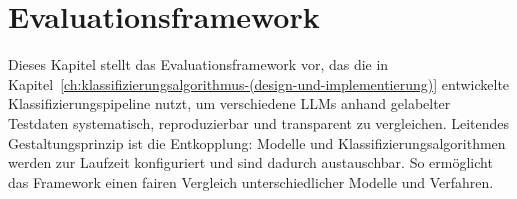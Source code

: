 
\chapter{Evaluationsframework}\label{ch:evaluationsframework}

Dieses Kapitel stellt das Evaluationsframework vor, das die in Kapitel~\ref{ch:klassifizierungsalgorithmus-(design-und-implementierung)} entwickelte Klassifizierungspipeline nutzt, um verschiedene \acp{LLM} anhand gelabelter Testdaten systematisch, reproduzierbar und transparent zu vergleichen. Leitendes Gestaltungsprinzip ist die Entkopplung: Modelle und Klassifizierungsalgorithmen werden zur Laufzeit konfiguriert und sind dadurch austauschbar. So ermöglicht das Framework einen fairen Vergleich unterschiedlicher Modelle und Verfahren.







